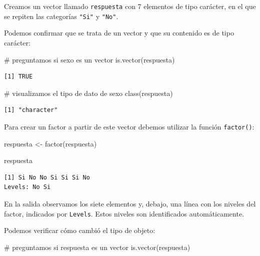 \documentclass[
  spanish,
  a4paper,
]{scrbook}
\newenvironment{Shaded}{\begin{snugshade}}{\end{snugshade}}
\newcommand{\CommentTok}[1]{\textcolor[rgb]{0.37,0.37,0.37}{#1}}
\newcommand{\FunctionTok}[1]{\textcolor[rgb]{0.28,0.35,0.67}{#1}}
\newcommand{\NormalTok}[1]{\textcolor[rgb]{0.00,0.23,0.31}{#1}}
\newcommand{\OtherTok}[1]{\textcolor[rgb]{0.00,0.23,0.31}{#1}}
\begin{document}
Creamos un vector llamado \texttt{respuesta} con 7 elementos de tipo
carácter, en el que se repiten las categorías \texttt{"Si"} y
\texttt{"No"}.

Podemos confirmar que se trata de un vector y que su contenido es de
tipo carácter:

\begin{Shaded}
\begin{Highlighting}[]
\CommentTok{\# preguntamos si sexo es un vector}
\FunctionTok{is.vector}\NormalTok{(respuesta)}
\end{Highlighting}
\end{Shaded}

\begin{verbatim}
[1] TRUE
\end{verbatim}

\begin{Shaded}
\begin{Highlighting}[]
\CommentTok{\# visualizamos el tipo de dato de sexo}
\FunctionTok{class}\NormalTok{(respuesta)}
\end{Highlighting}
\end{Shaded}

\begin{verbatim}
[1] "character"
\end{verbatim}

Para crear un factor a partir de este vector debemos utilizar la función
\texttt{factor()}:

\begin{Shaded}
\begin{Highlighting}[]
\NormalTok{respuesta }\OtherTok{\textless{}{-}} \FunctionTok{factor}\NormalTok{(respuesta)}

\NormalTok{respuesta}
\end{Highlighting}
\end{Shaded}

\begin{verbatim}
[1] Si No No Si Si Si No
Levels: No Si
\end{verbatim}

En la salida observamos los siete elementos y, debajo, una línea con los
niveles del factor, indicados por \texttt{Levels}. Estos niveles son
identificados automáticamente.

Podemos verificar cómo cambió el tipo de objeto:

\begin{Shaded}
\begin{Highlighting}[]
\CommentTok{\# preguntamos si respuesta es un vector}
\FunctionTok{is.vector}\NormalTok{(respuesta)}
\end{Highlighting}
\end{Shaded}
\end{document}
